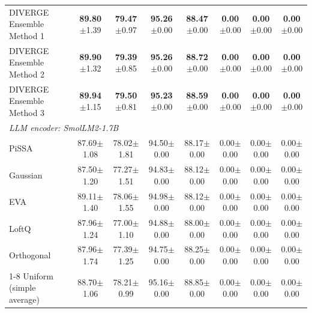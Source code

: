 \documentclass[a4paper,fleqn]{cas-sc}
\begin{document}
\begin{table}[htbp]
\begin{tabular*}{\textwidth}{@{\extracolsep{\fill}} lccccccc @{}}
DIVERGE Ensemble Method 1 & \textbf{89.80}{\scriptsize$\pm$1.39} & \textbf{79.47}{\scriptsize$\pm$0.97} & \textbf{95.26}{\scriptsize$\pm$0.00} & \textbf{88.47}{\scriptsize$\pm$0.00} & \textbf{0.00}{\scriptsize$\pm$0.00} & \textbf{0.00}{\scriptsize$\pm$0.00} & \textbf{0.00}{\scriptsize$\pm$0.00} \\
DIVERGE Ensemble Method 2 & \textbf{89.90}{\scriptsize$\pm$1.32} & \textbf{79.39}{\scriptsize$\pm$0.85} & \textbf{95.26}{\scriptsize$\pm$0.00} & \textbf{88.72}{\scriptsize$\pm$0.00} & \textbf{0.00}{\scriptsize$\pm$0.00} & \textbf{0.00}{\scriptsize$\pm$0.00} & \textbf{0.00}{\scriptsize$\pm$0.00} \\
DIVERGE Ensemble Method 3 & \textbf{89.94}{\scriptsize$\pm$1.15} & \textbf{79.50}{\scriptsize$\pm$0.81} & \textbf{95.23}{\scriptsize$\pm$0.00} & \textbf{88.59}{\scriptsize$\pm$0.00} & \textbf{0.00}{\scriptsize$\pm$0.00} & \textbf{0.00}{\scriptsize$\pm$0.00} & \textbf{0.00}{\scriptsize$\pm$0.00} \\
\midrule
\multicolumn{8}{l}{\textit{LLM encoder: SmolLM2-1.7B}} \\
\midrule
PiSSA                     & 87.69{\scriptsize$\pm$1.08} & 78.02{\scriptsize$\pm$1.81} & 94.50{\scriptsize$\pm$0.00} & 88.17{\scriptsize$\pm$0.00} & 0.00{\scriptsize$\pm$0.00} & 0.00{\scriptsize$\pm$0.00} & 0.00{\scriptsize$\pm$0.00} \\
Gaussian                  & 87.50{\scriptsize$\pm$1.20} & 77.27{\scriptsize$\pm$1.51} & 94.83{\scriptsize$\pm$0.00} & 88.12{\scriptsize$\pm$0.00} & 0.00{\scriptsize$\pm$0.00} & 0.00{\scriptsize$\pm$0.00} & 0.00{\scriptsize$\pm$0.00} \\
EVA                       & 89.11{\scriptsize$\pm$1.40} & 78.06{\scriptsize$\pm$1.55} & 94.98{\scriptsize$\pm$0.00} & 88.12{\scriptsize$\pm$0.00} & 0.00{\scriptsize$\pm$0.00} & 0.00{\scriptsize$\pm$0.00} & 0.00{\scriptsize$\pm$0.00} \\
LoftQ                     & 87.96{\scriptsize$\pm$1.24} & 77.00{\scriptsize$\pm$1.10} & 94.88{\scriptsize$\pm$0.00} & 88.00{\scriptsize$\pm$0.00} & 0.00{\scriptsize$\pm$0.00} & 0.00{\scriptsize$\pm$0.00} & 0.00{\scriptsize$\pm$0.00} \\
Orthogonal                & 87.96{\scriptsize$\pm$1.74} & 77.39{\scriptsize$\pm$1.25} & 94.75{\scriptsize$\pm$0.00} & 88.25{\scriptsize$\pm$0.00} & 0.00{\scriptsize$\pm$0.00} & 0.00{\scriptsize$\pm$0.00} & 0.00{\scriptsize$\pm$0.00} \\
\cmidrule(lr){1-8}
Uniform (simple average)  & 88.70{\scriptsize$\pm$1.06} & 78.21{\scriptsize$\pm$0.99} & 95.16{\scriptsize$\pm$0.00} & 88.85{\scriptsize$\pm$0.00} & 0.00{\scriptsize$\pm$0.00} & 0.00{\scriptsize$\pm$0.00} & 0.00{\scriptsize$\pm$0.00} \\

\end{tabular*}
\end{table}
\end{document}
